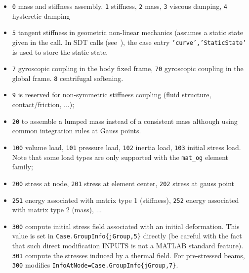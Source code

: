 \begin{itemize}
\item {\tt 0} mass and stiffness assembly.  {\tt 1} stiffness, {\tt 2} mass, {\tt 3} viscous damping,  {\tt 4} hysteretic damping 
\item {\tt 5} tangent stiffness in geometric non-linear mechanics (assumes a static state given in the call. In SDT calls (see~), the case entry {\tt 'curve','StaticState'} is used to store the static state.
\item {\tt 7} gyroscopic coupling in the body fixed frame, {\tt 70} gyroscopic coupling in the global frame. {\tt 8} centrifugal softening. 
\item {\tt 9} is reserved for non-symmetric stiffness coupling (fluid structure, contact/friction, ...);
\item {\tt 20} to assemble a lumped mass instead of a consistent mass although using common integration rules at Gauss points.
\item {\tt 100} volume load, {\tt 101} pressure load, {\tt 102} inertia load, {\tt 103} initial stress load. Note that some load types are only supported with the {\tt mat\_og} element family; 
\item {\tt 200} stress at node, {\tt 201} stress at element center, {\tt 202} stress at gauss point
\item {\tt 251} energy associated with matrix type 1 (stiffness), {\tt 252} energy associated with matrix type 2 (mass), ...  
\item {\tt 300} compute initial stress field associated with an initial deformation. This value is set in {\tt Case.GroupInfo\{jGroup,5\}} directly (be careful with the fact that such direct modification INPUTS is not a MATLAB standard feature). {\tt 301} compute the stresses induced by a thermal field. For pre-stressed beams, {\tt 300} modifies  {\tt InfoAtNode=Case.GroupInfo\{jGroup,7\}}.

\end{itemize}

